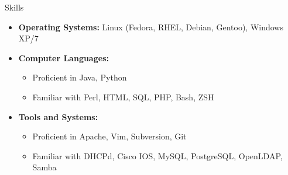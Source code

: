 \documentclass[11pt,oneside]{article}
\newenvironment{ressection}[1]{
	\vspace{3pt}
	{\fontfamily{phv}\selectfont\Large#1}
	\begin{itemize}
	\vspace{2pt}
}{
	\end{itemize}
}
\newcommand{\resitem}[1]{
	\vspace{-3pt}
	\item \begin{flushleft} #1 \end{flushleft}
}
\newcommand{\ressubitem}[1]{
	\vspace{-1pt}
	\item \begin{flushleft} #1 \end{flushleft}
}
\newenvironment{reslist}[1]{
	\resitem{\textbf{#1}}
	\vspace{-4pt}
	\begin{itemize}
}{
	\end{itemize}
}
\begin{document}
\begin{ressection}{Skills}

	\resitem{\textbf{Operating Systems:} Linux (Fedora, RHEL, Debian, Gentoo), Windows XP/7}

	\begin{reslist}{Computer Languages:}

		\ressubitem{Proficient in Java, Python}

		\ressubitem{Familiar with Perl, HTML, SQL, PHP, Bash, ZSH}

	\end{reslist}

	\begin{reslist}{Tools and Systems:}

		\ressubitem{Proficient in Apache, Vim, Subversion, Git}

		\ressubitem{Familiar with DHCPd, Cisco IOS, MySQL, PostgreSQL, OpenLDAP, Samba}

	\end{reslist}


\end{ressection}

\end{document}
